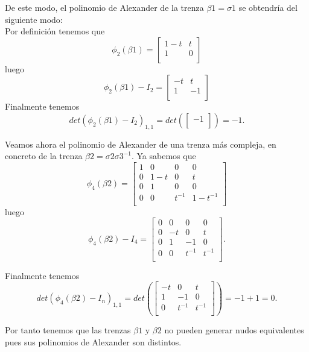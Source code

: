 De este modo, el polinomio de Alexander de la trenza $\beta1 = \sigma1$ se obtendría del siguiente modo:\\
Por definición tenemos que  
\[ \phi_{2} (\beta1) = \begin{bmatrix}
1-t & t  \\
1 & 0 \\
\end{bmatrix}\]
luego 
\[ \phi_{2} (\beta1) - I_{2}= \begin{bmatrix}
-t & t  \\
1 & -1 \\
\end{bmatrix}\]
Finalmente tenemos 
\[ det(\phi_{2} (\beta1) - I_{2})_{1,1} = det(\begin{bmatrix}
-1 \\
\end{bmatrix}) = -1.\]

Veamos ahora el polinomio de Alexander de una trenza más compleja, en concreto de la trenza $\beta2 = \sigma2\sigma3^{-1}$. Ya sabemos que 
 \[ \phi_{4} (\beta2) = \begin{bmatrix}
 1 & 0 & 0 & 0 \\
 0 & 1-t & 0 & t \\
 0 & 1 & 0 & 0  \\	
 0 & 0 & t^{-1} & 1-t^{-1} \\
 \end{bmatrix}\]
 luego
  \[ \phi_{4} (\beta2) - I_{4} = \begin{bmatrix}
  0 & 0 & 0 & 0 \\
  0 & -t & 0 & t \\
  0 & 1 & -1 & 0  \\	
  0 & 0 & t^{-1} & t^{-1} \\
  \end{bmatrix}.\]
  
  Finalmente tenemos 
    \[ det(\phi_{4} (\beta2) - I_{n})_{1,1} = det(\begin{bmatrix}
    -t & 0 & t \\
     1 & -1 & 0  \\	
     0 & t^{-1} & t^{-1} \\
    \end{bmatrix}) = -1+1 = 0.\]
    
Por tanto tenemos que las trenzas $\beta1$ y $\beta2$ no pueden generar nudos equivalentes pues sus polinomios de Alexander son distintos.\\
    
